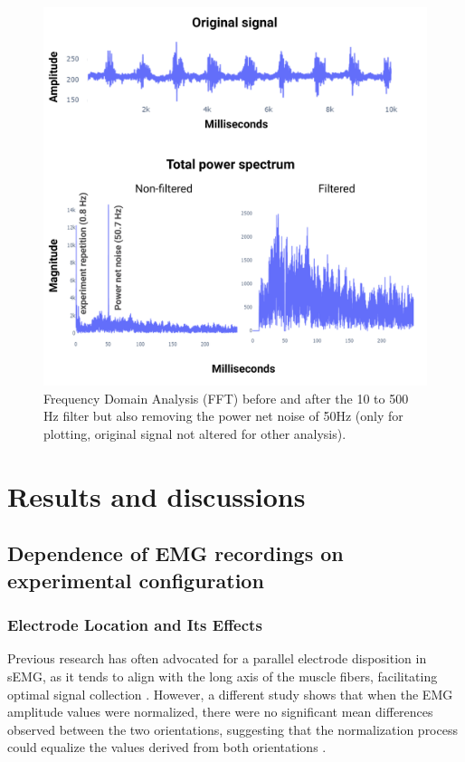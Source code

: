\documentclass[conference]{IEEEtran}
\begin{document}
\begin{figure}[h]
   \centering
   \includegraphics[width=1\linewidth]{fft_tps.png}
   \caption{Frequency Domain Analysis (FFT) before and after the 10 to 500 Hz filter but also removing the power net noise of 50Hz 
   (only for plotting, original signal not altered for other analysis).}
   \label{fig:fft_tps}
\end{figure}


\section{Results and discussions}

\subsection{Dependence of EMG recordings on experimental configuration}

\subsubsection{Electrode Location and Its Effects}

Previous research has often advocated for a parallel electrode 
disposition in sEMG, as it tends to 
align with the long axis of the muscle fibers, facilitating 
optimal signal collection \cite{youngEffectsElectrodeSize2011}.
However, a different study shows that when the EMG amplitude values were normalized, there 
were no significant mean differences observed between the two 
orientations, suggesting that the normalization process could 
equalize the values derived from both orientations \cite{zunigaEffectsParallelPerpendicular2010}.
\end{document}
